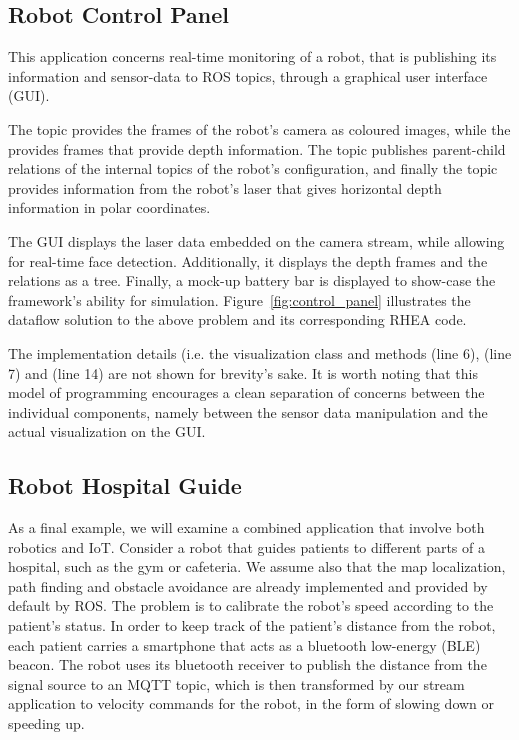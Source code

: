 \documentclass[sigplan,screen,10pt]{acmart}
\begin{document}
\subsection{Robot Control Panel}

This application concerns real-time monitoring of a robot, that is publishing
its information and sensor-data to ROS topics, through a
graphical user interface (GUI).

The  topic provides the frames of the robot's camera as
coloured images, while the  provides frames that provide
depth information. The  topic publishes parent-child relations of
the internal topics of the robot's configuration, and finally the
 topic provides information from the robot's laser that gives
horizontal depth information in polar coordinates.

The GUI displays the laser data embedded on the camera stream, while allowing
for real-time face detection. Additionally, it displays the depth frames and the
 relations as a tree. Finally, a mock-up battery bar is displayed to
show-case the framework's ability for simulation. Figure~\ref{fig:control_panel}
illustrates the dataflow solution to the above problem and its corresponding
\textsc{RHEA} code.
%

The implementation details (i.e. the visualization class and methods
 (line 6),  (line 7) and
 (line 14) are not shown for brevity's sake. It is worth noting
that this model of programming encourages a clean separation of concerns between the
individual components, namely between the sensor data manipulation and the
actual visualization on the GUI.

\subsection{Robot Hospital Guide}

As a final example, we will examine a combined application that involve both robotics and IoT.
Consider a robot that guides patients to different parts of a hospital, such as the gym or
cafeteria. We assume also that the map localization, path finding and obstacle
avoidance are already implemented and provided by default by ROS. The problem
is to calibrate the robot's speed according to the patient's status.
%
In order to keep track of the patient's distance from the robot, each patient carries a
smartphone that acts as a bluetooth low-energy (BLE) beacon. The robot uses its
bluetooth receiver to publish the distance from the signal source to an
MQTT topic, which is then transformed by our stream application to velocity
commands for the robot, in the form of slowing down or speeding up.
\end{document}
